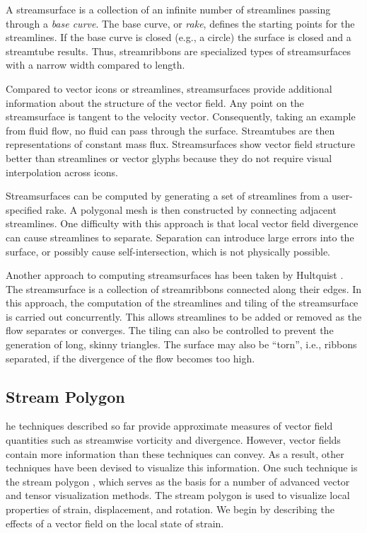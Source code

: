 A streamsurface is a collection of an infinite number of streamlines passing through a \emph{base curve}. The base curve, or \emph{rake}, defines the starting points for the streamlines. If the base curve is closed (e.g., a circle) the surface is closed and a streamtube results. Thus, streamribbons are specialized types of streamsurfaces with a narrow width compared to length.

Compared to vector icons or streamlines, streamsurfaces provide additional information about the structure of the vector field. Any point on the streamsurface is tangent to the velocity vector. Consequently, taking an example from fluid flow, no fluid can pass through the surface. Streamtubes are then representations of constant mass flux. Streamsurfaces show vector field structure better than streamlines or vector glyphs because they do not require visual interpolation across icons.

Streamsurfaces can be computed by generating a set of streamlines from a user-specified rake. A polygonal mesh is then constructed by connecting adjacent streamlines. One difficulty with this approach is that local vector field divergence can cause streamlines to separate. Separation can introduce large errors into the surface, or possibly cause self-intersection, which is not physically possible.

Another approach to computing streamsurfaces has been taken by Hultquist \cite{Hultquist92}. The streamsurface is a collection of streamribbons connected along their edges. In this approach, the computation of the streamlines and tiling of the streamsurface is carried out concurrently. This allows streamlines to be added or removed as the flow separates or converges. The tiling can also be controlled to prevent the generation of long, skinny triangles. The surface may also be ``torn'', i.e., ribbons separated, if the divergence of the flow becomes too high.

\subsection{Stream Polygon}

he techniques described so far provide approximate measures of vector field quantities such as streamwise vorticity and divergence. However, vector fields contain more information than these techniques can convey. As a result, other techniques have been devised to visualize this information. One such technique is the stream polygon \cite{Schroeder91}, which serves as the basis for a number of advanced vector and tensor visualization methods. The stream polygon is used to visualize local properties of strain, displacement, and rotation. We begin by describing the effects of a vector field on the local state of strain.


